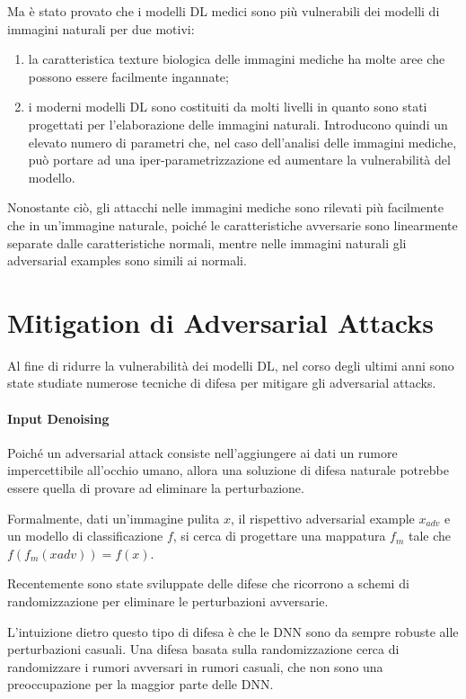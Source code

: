 Ma è stato provato %
\cite{ma2021understanding} che i modelli DL medici sono più vulnerabili dei modelli di immagini naturali per due motivi: 
    \begin{enumerate}
        \item la caratteristica texture biologica delle immagini mediche ha molte aree che possono essere facilmente ingannate;
        \item i moderni modelli DL sono costituiti da molti livelli in quanto sono stati progettati per l'elaborazione delle immagini naturali. Introducono quindi un elevato numero di parametri che, nel caso dell'analisi delle immagini mediche, può portare ad una iper-parametrizzazione ed aumentare la vulnerabilità del modello.
    \end{enumerate}

Nonostante ciò, gli attacchi nelle immagini mediche sono rilevati più facilmente che in un'immagine naturale, poiché le caratteristiche avversarie sono linearmente separate dalle caratteristiche normali, mentre nelle immagini naturali gli adversarial examples sono simili ai normali.

\newpage

\section{Mitigation di Adversarial Attacks}
Al fine di ridurre la vulnerabilità dei modelli DL, nel corso degli ultimi anni sono state studiate numerose tecniche di difesa per mitigare gli adversarial attacks.

\paragraph{Input Denoising}
Poiché un adversarial attack consiste nell'aggiungere ai dati un rumore impercettibile all'occhio umano, allora una soluzione di difesa naturale potrebbe essere quella di provare ad eliminare la perturbazione.

Formalmente, dati un'immagine pulita $x$, il rispettivo adversarial example $x_{adv}$ e un modello di classificazione $f$, si cerca di progettare una mappatura $f_m$ tale che $f(f_m(x{adv})) = f(x)$.

Recentemente sono state sviluppate delle difese che ricorrono a schemi di randomizzazione per eliminare le perturbazioni avversarie. 

L'intuizione dietro questo tipo di difesa è che le DNN sono da sempre robuste alle perturbazioni casuali. Una difesa basata sulla randomizzazione cerca di randomizzare i rumori avversari in rumori casuali, che non sono una preoccupazione per la maggior parte delle DNN. 
\\

